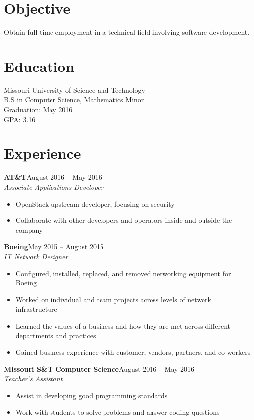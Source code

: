 \documentclass[margin]{res}
\begin{document}
  \begin{resume} 
    \section{Objective} 
      Obtain full-time employment in a technical field involving software development.

    \section{Education}
      Missouri University of Science and Technology \\ 
      B.S in Computer Science, Mathematics Minor \\
      Graduation: May 2016 \\
      GPA: 3.16

	\section{Experience}
	   \textbf{AT\&T}\hfill August 2016 -- May 2016\\
       \textit{Associate Applications Developer} 
       \begin{itemize} \itemsep -1pt  %
         \item OpenStack upstream developer, focusing on security
         \item Collaborate with other developers and operators inside and outside the company
       \end{itemize}
	
       \textbf{Boeing}\hfill May 2015 -- August 2015 \\
       \textit{IT Network Designer}\hfill 
       \begin{itemize} \itemsep -1pt  %
         \item Configured, installed, replaced, and removed networking equipment for Boeing
         \item Worked on individual and team projects across levels of network infrastructure 
         \item Learned the values of a business and how they are met across different departments and practices
         \item Gained business experience with customer, vendors, partners, and co-workers
       \end{itemize}

	   \textbf{Missouri S\&T Computer Science}\hfill August 2016 -- May 2016\\
       \textit{Teacher's Assistant} 
       \begin{itemize} \itemsep -1pt  %
         \item Assist in developing good programming standards
         \item Work with students to solve problems and answer coding questions
       \end{itemize}


\end{resume}
\end{document}
